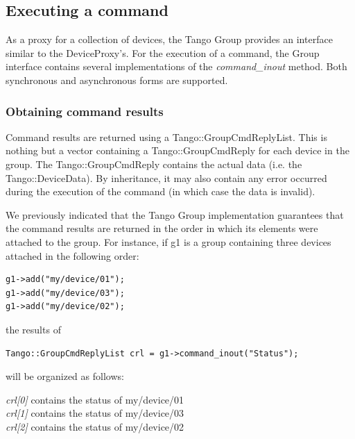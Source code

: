\subsection{Executing a command}

As a proxy for a collection of devices, the Tango Group provides an
interface similar to the DeviceProxy's. For the execution of a command,
the Group interface contains several implementations
of the \emph{command\_inout} method. Both synchronous
and asynchronous forms are supported. 


\subsubsection{Obtaining command results}
\label{sub:Obt-cmd-results}

Command results are returned using a Tango::GroupCmdReplyList.
This is nothing but a vector containing a Tango::GroupCmdReply
for each device in the group. The Tango::GroupCmdReply contains the
actual data (i.e. the Tango::DeviceData). By inheritance, it may also
contain any error occurred during the execution of the command (in
which case the data is invalid). 

We previously indicated that the Tango Group implementation guarantees
that the command results are returned in the order in which its elements
were attached to the group. For instance, if g1 is a group containing
three devices attached in the following order:
\begin{verbatim}
g1->add("my/device/01");
g1->add("my/device/03");
g1->add("my/device/02");
\end{verbatim}
the results of 
\begin{verbatim}
Tango::GroupCmdReplyList crl = g1->command_inout("Status");
\end{verbatim}
will be organized as follows:

\emph{crl{[}0{]}} contains the status of my/device/01 \\
\emph{crl{[}1{]}} contains the status of my/device/03 \\
\emph{crl{[}2{]}} contains the status of my/device/02

